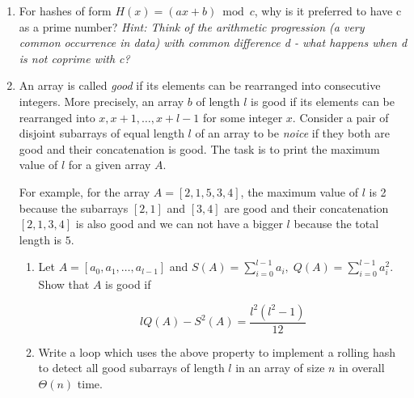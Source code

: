 \begin{enumerate}
\begin{enumerate}[label=\textbf{(\alph*)}]
\item Use the result from \textbf{(f)} and apply the pigeonhole principle to conclude that there 
exists a pair of keys $x^*,y^*$ such that\footnote{This conclusion shows why universal hash families 
operating on a large domain have the requirement of collision probability upper bound $\frac{1}{m}$, 
because the guarantee is optimal for $n \gg m$. Any guarantee smaller than that is impossible 
because the pigeonhole principle shows the existence of a pair of keys 
which violate any guarantee smaller than $\frac{1}{m}$.}

\[
	\Pr\limits_{h \in \mathcal H}(h(x^*)=h(y^*)) \ge \frac{n-m}{m(n-1)} \approx \frac{1}{m}
\]



\end{enumerate}

\item[\textbf{2}]
For hashes of form $H(x)=(ax+b)\bmod c$, why is it preferred to have c as a prime number? \textit{Hint: Think of 
the arithmetic progression (a very common occurrence in data) with common difference d - 
what happens when d is not coprime with c?}

\item[\textbf{3}]
An array is called \emph{good} if its elements can be rearranged into consecutive integers. More precisely,
an array $b$ of length $l$ is good if its elements can be rearranged into $x,x+1,\dots,x+l-1$ 
for some integer $x$. Consider a pair of disjoint subarrays of equal length $l$ of an array to be 
\emph{noice} if they both are good and their concatenation is good. The task is to print the maximum value of 
$l$ for a given array $A$. 

For example, for the array $A=[2,1,5,3,4]$, the maximum value of $l$ is 2 because the subarrays
$[2,1]$ and $[3,4]$ are good and their concatenation $[2,1,3,4]$ is also good and we can not have a bigger 
$l$ because the total length is $5$.

\begin{enumerate}[label=\textbf{(\alph*)}]
\item Let $A=[a_0,a_1,\dots,a_{l-1}]$ and $S(A)=\sum\limits_{i=0}^{l-1} a_i,\; 
Q(A)=\sum\limits_{i=0}^{l-1} a_i^2$. Show that $A$ is good if 

\[
lQ(A)-S^2(A)=\frac{l^2(l^2-1)}{12}
\]

\item Write a loop which uses the above property to implement a rolling hash to detect all good subarrays of 
length $l$ in an array of size $n$ in overall $\Theta(n)$ time. 


\end{enumerate}
\end{enumerate}
